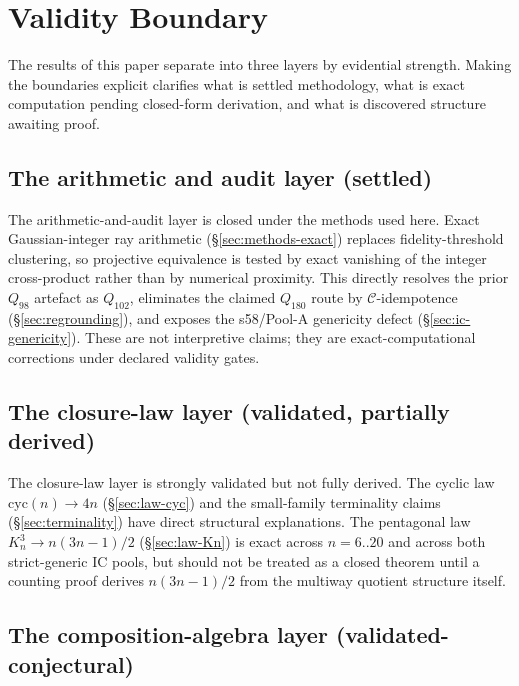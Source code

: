 \documentclass[12pt,a4paper]{article}
\theoremstyle{definition}
\theoremstyle{remark}
\newcommand{\Kn}{K_n^3}
\newcommand{\Ccls}{\mathcal{C}}             %
\newcommand{\cyc}{\mathrm{cyc}}
\begin{document}
\section{Validity Boundary}\label{sec:validity-boundary}

The results of this paper separate into three layers by evidential
strength. Making the boundaries explicit clarifies what is settled
methodology, what is exact computation pending closed-form derivation,
and what is discovered structure awaiting proof.

\subsection{The arithmetic and audit layer (settled)}\label{sec:vb-audit}

The arithmetic-and-audit layer is closed under the methods used here.
Exact Gaussian-integer ray arithmetic
(\S\ref{sec:methods-exact}) replaces fidelity-threshold clustering, so
projective equivalence is tested by exact vanishing of the integer
cross-product rather than by numerical proximity. This directly
resolves the prior $Q_{98}$ artefact as $Q_{102}$, eliminates the
claimed $Q_{180}$ route by $\Ccls$-idempotence
(\S\ref{sec:regrounding}), and exposes the s58/Pool-A genericity defect
(\S\ref{sec:ic-genericity}). These are not interpretive claims; they
are exact-computational corrections under declared validity gates.

\subsection{The closure-law layer (validated, partially derived)}\label{sec:vb-laws}

The closure-law layer is strongly validated but not fully derived. The
cyclic law $\cyc(n) \to 4n$ (\S\ref{sec:law-cyc}) and the small-family
terminality claims (\S\ref{sec:terminality}) have direct structural
explanations. The pentagonal law $\Kn \to n(3n{-}1)/2$
(\S\ref{sec:law-Kn}) is exact across $n = 6..20$ and across both
strict-generic IC pools, but should not be treated as a closed theorem
until a counting proof derives $n(3n{-}1)/2$ from the multiway quotient
structure itself.

\subsection{The composition-algebra layer (validated-conjectural)}\label{sec:vb-algebra}
\end{document}
